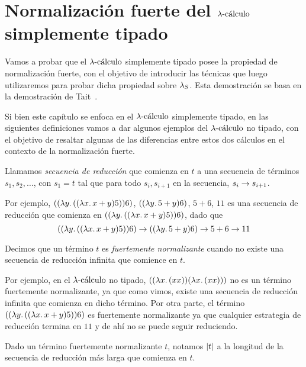 \chapter{Normalización fuerte del \texorpdfstring{\( \lambdacalculus \)}{lambda calculus} simplemente tipado}\label{Chapter3}

Vamos a probar que el \( \lambdacalculus \) simplemente tipado posee la propiedad de normalización fuerte, con el objetivo de introducir las técnicas que luego utilizaremos para probar dicha propiedad sobre \( \lambdas \). Esta demostración se basa en la demostración de Tait~\cite{tait}.

Si bien este capítulo se enfoca en el \( \lambdacalculus \) simplemente tipado, en las siguientes definiciones vamos a dar algunos ejemplos del \( \lambdacalculus \) no tipado, con el objetivo de resaltar algunas de las diferencias entre estos dos cálculos en el contexto de la normalización fuerte.

\begin{definition}
  Llamamos \textit{secuencia de reducción} que comienza en \( t \) a una secuencia de términos \( s_1, s_2, \dots \), con \( s_1 = t \) tal que para todo \( s_i, s_{i + 1} \) en la secuencia, \( s_i \reducesto s_{i + 1} \).
\end{definition}
Por ejemplo, \( \lcapp{\lcabstr{y}{\lcapp{\lcabstr{x}{x + y}}{5}}}{6} \), \( \lcapp{\lcabstr{y}{5 + y}}{6} \), \( 5 + 6 \), \( 11 \) es una secuencia de reducción que comienza en \( \lcapp{\lcabstr{y}{\lcapp{\lcabstr{x}{x + y}}{5}}}{6} \),
dado que
\[ \lcapp{\lcabstr{y}{\lcapp{\lcabstr{x}{x + y}}{5}}}{6} \reducesto \lcapp{\lcabstr{y}{5 + y}}{6} \reducesto 5 + 6 \reducesto 11 \]

\begin{definition}
  Decimos que un término \( t \) es \textit{fuertemente normalizante} cuando no existe una secuencia de reducción infinita que comience en \( t \).
\end{definition}

Por ejemplo, en el \( \lambdacalculus \) no tipado, \( \lcapp{ \lcabstr{x}{\lcapp{x}{x}} }{ \lcabstr{x}{\lcapp{x}{x}} } \) no es un término fuertemente normalizante, ya que como vimos, existe una secuencia de reducción infinita que comienza en dicho término. Por otra parte, el término \( \lcapp{\lcabstr{y}{\lcapp{\lcabstr{x}{x + y}}{5}}}{6} \) es fuertemente normalizante ya que cualquier estrategia de reducción termina en \( 11 \) y de ahí no se puede seguir reduciendo.

\begin{definition}
  Dado un término fuertemente normalizante \( t \), notamos \( \lpl{t} \) a la longitud de la secuencia de reducción más larga que comienza en \( t \).
\end{definition}

